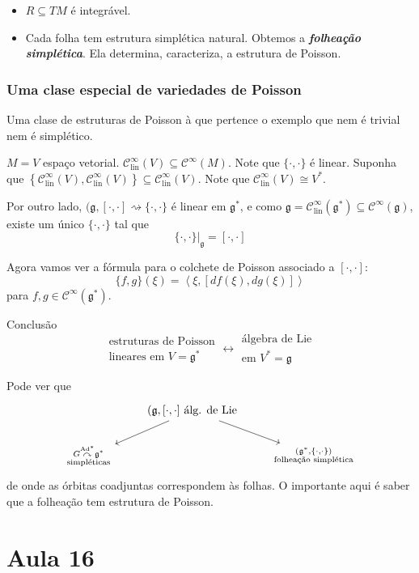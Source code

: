\begin{thm}\leavevmode
	\begin{itemize}
	\item $R\subseteq TM$ é integrável.
	\item Cada folha tem estrutura simplética natural. Obtemos a \textit{\textbf{folheação simplética}}. Ela determina, caracteriza, a estrutura de Poisson.
	\end{itemize}
\end{thm}

\subsubsection{Uma clase especial de variedades de Poisson}

Uma clase de estruturas de Poisson à que pertence o exemplo que nem é trivial nem é simplético.

$M=V$ espaço vetorial. $\mathcal{C}^\infty_{\operatorname{lin}}(V)\subseteq \mathcal{C}^\infty(M)$. Note que  $\{\cdot,\cdot\}$ é linear. Suponha que $\left\{ \mathcal{C}^\infty_{\operatorname{lin}}(V),\mathcal{C}^\infty_{\operatorname{lin}}(V) \right\} \subseteq \mathcal{C}^\infty_{\operatorname{lin}}(V)$. Note que $\mathcal{C}^\infty_{\operatorname{lin}}(V)\cong V^*$.

Por outro lado, $(\mathfrak{g},[\cdot,\cdot ]\rightsquigarrow \{\cdot,\cdot\}$ é linear em $\mathfrak{g}^*$, e como $\mathfrak{g} =\mathcal{C}^\infty_{\operatorname{lin}}(\mathfrak{g}^*)\subseteq \mathcal{C}^\infty(\mathfrak{g})$, existe um único $\{\cdot,\cdot\}$ tal que
\[\{\cdot,\cdot\}|_{\mathfrak{g}}=[\cdot,\cdot ]\]

Agora vamos ver a fórmula para o colchete de Poisson associado a $[\cdot,\cdot ]$:
\[\{f,g\}(\xi)=\left<\xi,[df(\xi),dg(\xi)]\right> \]
para $f,g\in\mathcal{C}^\infty(\mathfrak{g}^*)$.

\begin{idea4}{Conclusão}\leavevmode
	\[\substack{\text{estruturas de Poisson}  \\ \text{lineares em $V=\mathfrak{g}^*$} }\longleftrightarrow \substack{\text{álgebra de Lie}  \\ \text{em $V^*=\mathfrak{g}$} }\]
\end{idea4}

Pode ver que
\[\begin{tikzcd}
	&(\mathfrak{g},[\cdot,\cdot ]\text{ álg. de Lie} \arrow[dl]\arrow[dr]\\
	\substack{ G \overset{\operatorname{Ad}^*}{\curvearrowright}\mathfrak{g}^*\\\text{simpléticas}} && \substack{(\mathfrak{g}^* ,\{\cdot,\cdot\})\\\text{folheação simplética}} 
\end{tikzcd}\]
de onde as órbitas coadjuntas correspondem às folhas. O importante aqui é saber que a folheação tem estrutura de Poisson.






\section{Aula 16}



